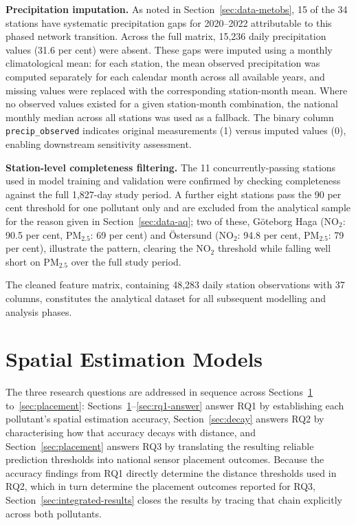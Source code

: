 \documentclass[11pt,a4paper]{article}
\let\oldsection\section
\renewcommand{\section}{\FloatBarrier\oldsection}
\begin{document}
\textbf{Precipitation imputation.} As noted in Section~\ref{sec:data-metobs}, 15 of the 34 stations have systematic precipitation gaps for 2020--2022 attributable to this phased network transition. Across the full matrix, 15,236 daily precipitation values (31.6 per cent) were absent. These gaps were imputed using a monthly climatological mean: for each station, the mean observed precipitation was computed separately for each calendar month across all available years, and missing values were replaced with the corresponding station-month mean. Where no observed values existed for a given station-month combination, the national monthly median across all stations was used as a fallback. The binary column \texttt{precip\_observed} indicates original measurements (1) versus imputed values (0), enabling downstream sensitivity assessment.

\textbf{Station-level completeness filtering.} The 11 concurrently-passing stations used in model training and validation were confirmed by checking completeness against the full 1,827-day study period. A further eight stations pass the 90 per cent threshold for one pollutant only and are excluded from the analytical sample for the reason given in Section~\ref{sec:data-aq}; two of these, Göteborg Haga (NO$_2$: 90.5 per cent, PM$_{2.5}$: 69 per cent) and Östersund (NO$_2$: 94.8 per cent, PM$_{2.5}$: 79 per cent), illustrate the pattern, clearing the NO$_2$ threshold while falling well short on PM$_{2.5}$ over the full study period.

The cleaned feature matrix, containing 48,283 daily station observations with 37 columns, constitutes the analytical dataset for all subsequent modelling and analysis phases.

\section{Spatial Estimation Models}
\label{sec:models}

The three research questions are addressed in sequence across Sections~\ref{sec:models} to~\ref{sec:placement}: Sections~\ref{sec:models}--\ref{sec:rq1-answer} answer RQ1 by establishing each pollutant's spatial estimation accuracy, Section~\ref{sec:decay} answers RQ2 by characterising how that accuracy decays with distance, and Section~\ref{sec:placement} answers RQ3 by translating the resulting reliable prediction thresholds into national sensor placement outcomes. Because the accuracy findings from RQ1 directly determine the distance thresholds used in RQ2, which in turn determine the placement outcomes reported for RQ3, Section~\ref{sec:integrated-results} closes the results by tracing that chain explicitly across both pollutants.
\end{document}
